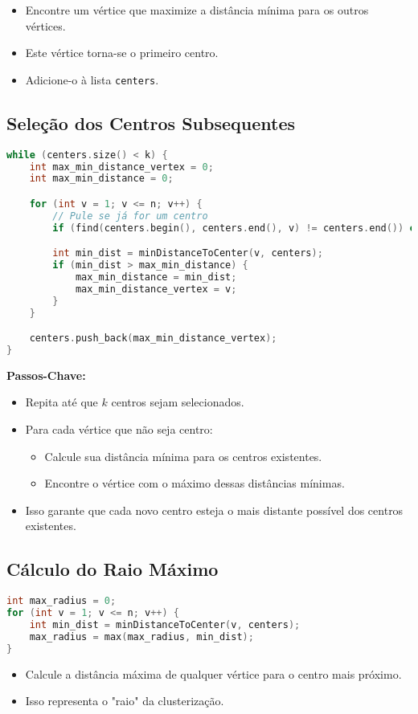 \documentclass[10pt,conference]{IEEEtran}
\begin{document}
\begin{itemize}
    \item Encontre um vértice que maximize a distância mínima para os outros vértices.
    \item Este vértice torna-se o primeiro centro.
    \item Adicione-o à lista \texttt{centers}.
\end{itemize}

\subsection{Seleção dos Centros Subsequentes}
\begin{lstlisting}[language=C++]
while (centers.size() < k) {
    int max_min_distance_vertex = 0;
    int max_min_distance = 0;

    for (int v = 1; v <= n; v++) {
        // Pule se já for um centro
        if (find(centers.begin(), centers.end(), v) != centers.end()) continue;

        int min_dist = minDistanceToCenter(v, centers);
        if (min_dist > max_min_distance) {
            max_min_distance = min_dist;
            max_min_distance_vertex = v;
        }
    }

    centers.push_back(max_min_distance_vertex);
}
\end{lstlisting}

\textbf{Passos-Chave:}
\begin{itemize}
    \item Repita até que $k$ centros sejam selecionados.
    \item Para cada vértice que não seja centro:
    \begin{itemize}
        \item Calcule sua distância mínima para os centros existentes.
        \item Encontre o vértice com o máximo dessas distâncias mínimas.
    \end{itemize}
    \item Isso garante que cada novo centro esteja o mais distante possível dos centros existentes.
\end{itemize}

\subsection{Cálculo do Raio Máximo}
\begin{lstlisting}[language=C++]
int max_radius = 0;
for (int v = 1; v <= n; v++) {
    int min_dist = minDistanceToCenter(v, centers);
    max_radius = max(max_radius, min_dist);
}
\end{lstlisting}
\begin{itemize}
    \item Calcule a distância máxima de qualquer vértice para o centro mais próximo.
    \item Isso representa o "raio" da clusterização.
\end{itemize}
\end{document}
